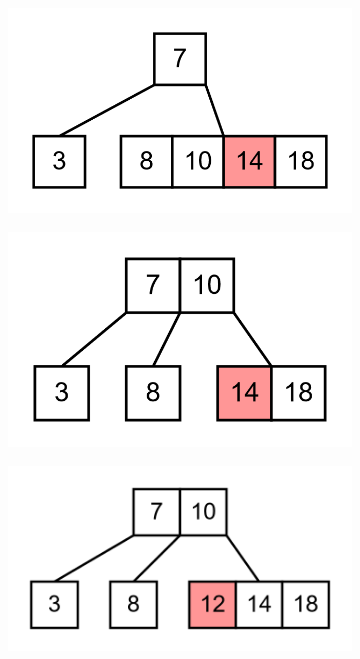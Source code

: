 \documentclass[11pt,a4paper]{article}
\begin{document}
\begin{loesung}
\begin{enumerate}
\begin{figure}[h!]
\begin{subfigure}[b]{0.31\textwidth}
            \end{subfigure}
            \begin{subfigure}[b]{0.31\textwidth}
                \centering
                \includegraphics[scale=0.15]{img/3d/7}
            \end{subfigure}
            \begin{subfigure}[b]{0.31\textwidth}
                \centering
                \includegraphics[scale=0.15]{img/3d/8}
            \end{subfigure}
            \begin{subfigure}[b]{0.31\textwidth}
                \centering
                \includegraphics[scale=0.15]{img/3d/9}

\end{subfigure}
\end{figure}
\end{enumerate}
\end{loesung}
\end{document}
